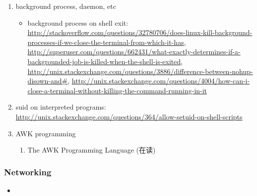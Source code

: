 \documentclass{article}
\begin{document}
\begin{enumerate}
    \item background process, daemon, etc
        \begin{itemize}
            \item background process on shell exit: \url{http://stackoverflow.com/questions/32780706/does-linux-kill-background-processes-if-we-close-the-terminal-from-which-it-has}, \url{http://superuser.com/questions/662431/what-exactly-determines-if-a-backgrounded-job-is-killed-when-the-shell-is-exited}, \url{http://unix.stackexchange.com/questions/3886/difference-between-nohup-disown-and#}, \url{http://unix.stackexchange.com/questions/4004/how-can-i-close-a-terminal-without-killing-the-command-running-in-it}
        \end{itemize}
    \item suid on interpreted programs: \url{http://unix.stackexchange.com/questions/364/allow-setuid-on-shell-scripts}
    \item AWK programming
        \begin{enumerate}
            \item The AWK Programming Language (在读)
        \end{enumerate}
\end{enumerate}
%
\subsubsection{Networking}
%
\begin{itemize}
    \item
\end{itemize}
%
\end{document}
